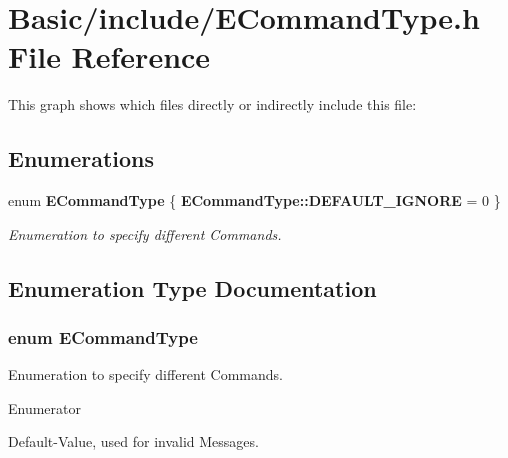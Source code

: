 \section{Basic/include/\-E\-Command\-Type.h File Reference}
\label{ECommandType_8h}
This graph shows which files directly or indirectly include this file\-:
\subsection*{Enumerations}
\begin{DoxyCompactItemize}
\item 
enum {\bf E\-Command\-Type} \{ {\bf E\-Command\-Type\-::\-D\-E\-F\-A\-U\-L\-T\-\_\-\-I\-G\-N\-O\-R\-E} = 0
 \}
\begin{DoxyCompactList}\small\item\em Enumeration to specify different Commands. \end{DoxyCompactList}\end{DoxyCompactItemize}


\subsection{Enumeration Type Documentation}
\subsubsection[{E\-Command\-Type}]{\setlength{\rightskip}{0pt plus 5cm}enum {\bf E\-Command\-Type}\hspace{0.3cm}{\ttfamily [strong]}}\label{ECommandType_8h_a6fe42c00db72b4aea2d9b7f80c0a0f1c}


Enumeration to specify different Commands. 

\begin{Desc}
\item[Enumerator]\par
\begin{description}
\item[{\em 
D\-E\-F\-A\-U\-L\-T\-\_\-\-I\-G\-N\-O\-R\-E\label{ECommandType_8h_a6fe42c00db72b4aea2d9b7f80c0a0f1cab7d218eabeaf0544a81da14b94b496bf}
}]Default-\/\-Value, used for invalid Messages. \end{description}
\end{Desc}

